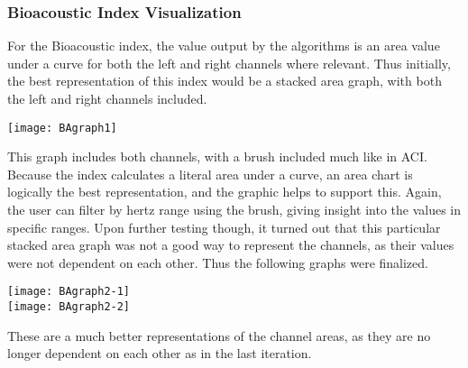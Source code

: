 \subsubsection{Bioacoustic Index Visualization}
For the Bioacoustic index, the value output by the algorithms is an area value under a curve for both the left and right channels where relevant. Thus initially, the best representation of this index would be a stacked area graph, with both the left and right channels included.\\

\begin{center}
	\texttt{[image: BAgraph1]} \\[12pt]
\end{center}
This graph includes both channels, with a brush included much like in ACI. Because the index calculates a literal area under a curve, an area chart is logically the best representation, and the graphic helps to support this. Again, the user can filter by hertz range using the brush, giving insight into the values in specific ranges. Upon further testing though, it turned out that this particular stacked area graph was not a good way to represent the channels, as their values were not dependent on each other. Thus the following graphs were finalized.\\

\begin{center}
	\texttt{[image: BAgraph2-1]} \\[12pt]
	\texttt{[image: BAgraph2-2]} \\[12pt]
\end{center}

These are a much better representations of the channel areas, as they are no longer dependent on each other as in the last iteration.
